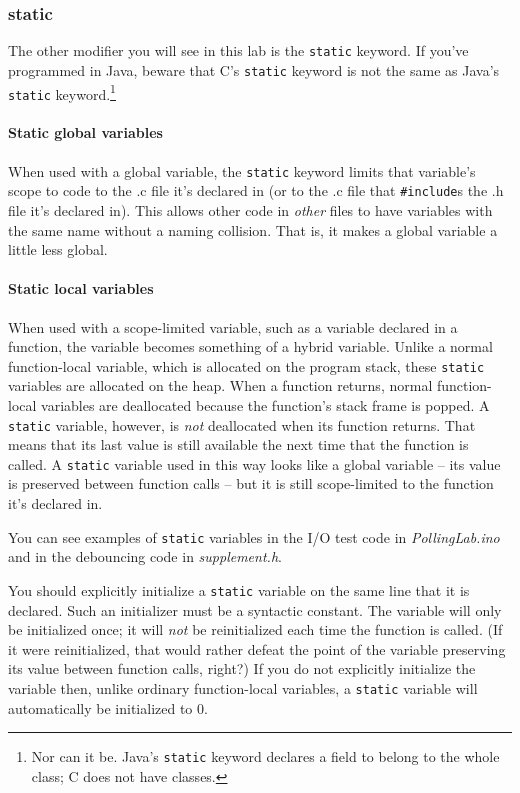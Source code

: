 \subsubsection{static}

The other modifier you will see in this lab is the \lstinline{static} keyword.
If you've programmed in Java, beware that C's \lstinline{static} keyword is not the same as Java's \lstinline{static} keyword.\footnote{
    Nor can it be.
    Java's \lstinline{static} keyword declares a field to belong to the whole class;
    C does not have classes.
}

\paragraph{Static global variables}

When used with a global variable, the \lstinline{static} keyword limits that variable's scope to code to the .c file it's declared in (or to the .c file that \lstinline{#include}s the .h file it's declared in).
This allows other code in \textit{other} files to have variables with the same name without a naming collision.
That is, it makes a global variable a little less global.

\paragraph{Static local variables}

When used with a scope-limited variable, such as a variable declared in a function, the variable becomes something of a hybrid variable.
Unlike a normal function-local variable, which is allocated on the program stack, these \lstinline{static} variables are allocated on the heap.
When a function returns, normal function-local variables are deallocated because the function's stack frame is popped.
A \lstinline{static} variable, however, is \textit{not} deallocated when its function returns.
That means that its last value is still available the next time that the function is called.
A \lstinline{static} variable used in this way looks like a global variable -- its value is preserved between function calls -- but it is still scope-limited to the function it's declared in.

You can see examples of \lstinline{static} variables in the I/O test code in \textit{PollingLab.ino} and in the debouncing code in \textit{supplement.h}.

You should explicitly initialize a \lstinline{static} variable on the same line that it is declared.
Such an initializer must be a syntactic constant.
The variable will only be initialized once; it will \textit{not} be reinitialized each time the function is called.
(If it were reinitialized, that would rather defeat the point of the variable preserving its value between function calls, right?)
If you do not explicitly initialize the variable then, unlike ordinary function-local variables, a \lstinline{static} variable will automatically be initialized to 0.

